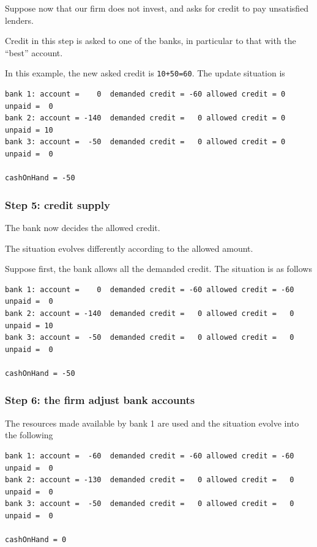 \documentclass{article}
\begin{document}
Suppose now that our firm does not invest, and asks for credit to pay unsatisfied lenders.

Credit in this step is asked to one of the banks, in particular to that with the ``best'' account.

In this example, the new asked credit is \verb/10+50=60/. The update situation is 

\begin{verbatim}
bank 1: account =    0  demanded credit = -60 allowed credit = 0 unpaid =  0
bank 2: account = -140  demanded credit =   0 allowed credit = 0 unpaid = 10
bank 3: account =  -50  demanded credit =   0 allowed credit = 0 unpaid =  0

cashOnHand = -50
\end{verbatim}






\subsubsection*{Step 5: credit supply}

The bank now decides the allowed credit.

The situation evolves differently according to the allowed amount.

Suppose first, the bank allows all the demanded credit. The situation is as follows

\begin{verbatim}
bank 1: account =    0  demanded credit = -60 allowed credit = -60 unpaid =  0
bank 2: account = -140  demanded credit =   0 allowed credit =   0 unpaid = 10
bank 3: account =  -50  demanded credit =   0 allowed credit =   0 unpaid =  0

cashOnHand = -50
\end{verbatim}

\subsubsection*{Step 6: the firm adjust bank accounts}

The resources made available by bank 1 are used and the situation evolve into the following

\begin{verbatim}
bank 1: account =  -60  demanded credit = -60 allowed credit = -60 unpaid =  0
bank 2: account = -130  demanded credit =   0 allowed credit =   0 unpaid =  0
bank 3: account =  -50  demanded credit =   0 allowed credit =   0 unpaid =  0

cashOnHand = 0
\end{verbatim}
\end{document}
